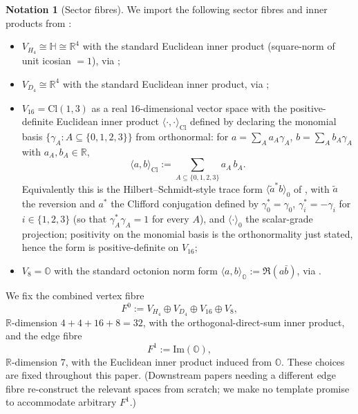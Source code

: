 \documentclass[11pt, a4paper]{amsart}
\theoremstyle{definition}
\newtheorem{notation}[theorem]{Notation}
\newcommand{\R}{\mathbb{R}}
\newcommand{\HH}{\mathbb{H}}
\newcommand{\OO}{\mathbb{O}}
\newcommand{\Cl}{\mathrm{Cl}}
\renewcommand{\Im}{\mathrm{Im}}
\begin{document}
\begin{notation}[Sector fibres]
\label{not:fibres}
We import the following sector fibres and inner products from
\cite{AlgebraicSubstrate}:
\begin{itemize}
\item $V_{H_4} \cong \HH \cong \R^4$ with the standard Euclidean
  inner product (square-norm of unit icosian $= 1$),
  via \cite[Definitions~\texttt{def:icosian-ring},
  \texttt{def:V600}]{AlgebraicSubstrate};
\item $V_{D_4} \cong \R^4$ with the standard Euclidean inner
  product, via \cite[Definition~\texttt{def:V24} and
  Proposition~\texttt{prop:24-in-600}]{AlgebraicSubstrate};
\item $V_{16} = \Cl(1, 3)$ as a real $16$-dimensional vector space
  with the positive-definite Euclidean inner product
  $\langle \cdot, \cdot \rangle_{\Cl}$ defined by declaring the
  monomial basis $\{\gamma_A : A \subseteq \{0, 1, 2, 3\}\}$ from
  \cite[Definition~\texttt{def:Cl-basis}]{AlgebraicSubstrate}
  orthonormal: for $a = \sum_A a_A \gamma_A$,
  $b = \sum_A b_A \gamma_A$ with $a_A, b_A \in \R$,
  \[
    \langle a, b \rangle_{\Cl} := \sum_{A \subseteq \{0, 1, 2, 3\}}
      a_A \, b_A.
  \]
  Equivalently this is the Hilbert--Schmidt-style trace form
  $\langle \tilde{a}^* b \rangle_0$ of \cite[Ch.~9]{Lounesto}, with
  $\tilde{a}$ the reversion and $a^*$ the Clifford conjugation
  defined by $\gamma_0^* = \gamma_0$, $\gamma_i^* = -\gamma_i$ for
  $i \in \{1, 2, 3\}$ (so that $\gamma_A^* \gamma_A = 1$ for every
  $A$), and $\langle \cdot \rangle_0$ the scalar-grade projection;
  positivity on the monomial basis is the orthonormality just
  stated, hence the form is positive-definite on $V_{16}$;
\item $V_8 = \OO$ with the standard octonion norm form
  $\langle a, b \rangle_\OO := \Re(a \bar b)$,
  via \cite[Definition~\texttt{def:octonions}]{AlgebraicSubstrate}.
\end{itemize}
We fix the combined vertex fibre
\[
  F^0 := V_{H_4} \oplus V_{D_4} \oplus V_{16} \oplus V_8,
\]
$\R$-dimension $4 + 4 + 16 + 8 = 32$, with the orthogonal-direct-sum
inner product, and the edge fibre
\[
  F^1 := \Im(\OO),
\]
$\R$-dimension $7$, with the Euclidean inner product induced from
$\OO$. These choices are fixed throughout this paper. (Downstream
papers needing a different edge fibre re-construct the relevant
spaces from scratch; we make no template promise to accommodate
arbitrary $F^1$.)
\end{notation}
\end{document}

